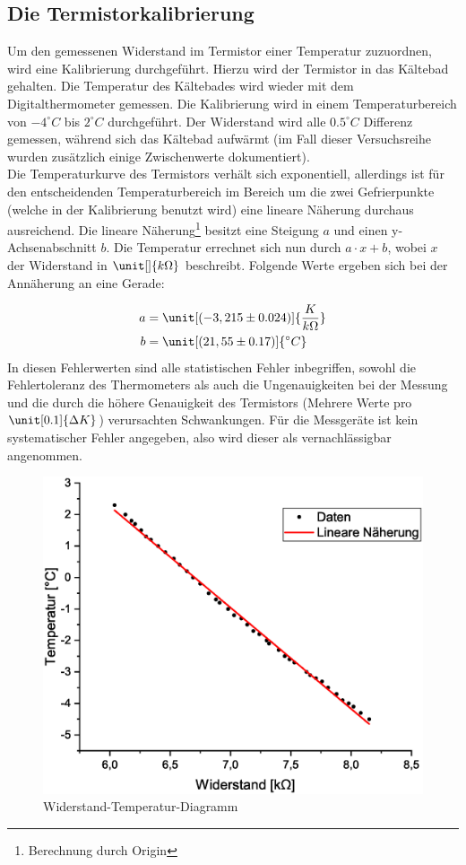 \subsection{Die Termistorkalibrierung}
Um den gemessenen Widerstand im Termistor einer Temperatur zuzuordnen, wird eine Kalibrierung durchgeführt. Hierzu wird der Termistor in das Kältebad gehalten. Die Temperatur des Kältebades wird wieder mit dem Digitalthermometer gemessen. Die Kalibrierung wird in einem Temperaturbereich von $-4^\circ C$ bis $2^\circ C$ durchgeführt. Der Widerstand wird alle $0.5^\circ C$ Differenz gemessen, während sich das Kältebad aufwärmt (im Fall dieser Versuchsreihe wurden zusätzlich einige Zwischenwerte dokumentiert).\\
Die Temperaturkurve des Termistors verhält sich exponentiell, allerdings ist für den entscheidenden Temperaturbereich im Bereich um die zwei Gefrierpunkte (welche in der Kalibrierung benutzt wird) eine lineare Näherung durchaus ausreichend. Die lineare Näherung\footnote{Berechnung durch Origin} besitzt eine Steigung $a$ und einen y-Achsenabschnitt $b$. Die Temperatur errechnet sich nun durch $a \cdot x + b$, wobei $x$ der Widerstand in $\unit[]{k\Omega}$ beschreibt. Folgende Werte ergeben sich bei der Annäherung an eine Gerade:

\begin{align*}
a &= \unit[(-3,215 \pm 0.024)]{\frac{K}{k\Omega}}\\
b &= \unit[(21,55 \pm 0.17)]{^\circ C}
\end{align*}
%
In diesen Fehlerwerten sind alle statistischen Fehler inbegriffen, sowohl die Fehlertoleranz des Thermometers als auch die Ungenauigkeiten bei der Messung und die durch die höhere Genauigkeit des Termistors (Mehrere Werte pro $\unit[0.1]{\Delta K}$) verursachten Schwankungen. Für die Messgeräte ist kein systematischer Fehler angegeben, also wird dieser als vernachlässigbar angenommen.


\begin{figure}
\begin{center}
\includegraphics[scale=0.5]{Bilder/Kalibrierung_Termistor.eps}
\caption{Widerstand-Temperatur-Diagramm}
\end{center}
\end{figure}





